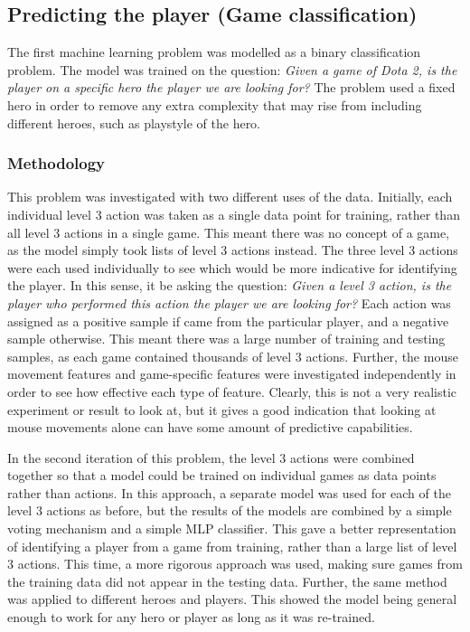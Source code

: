\documentclass{SizheArticle}
\begin{document}
\subsection{Predicting the player (Game classification)}
The first machine learning problem was modelled as a binary classification problem. The model was trained on the question: \textit{Given a game of Dota 2, is the player on a specific hero the player we are looking for?} The problem used a fixed hero in order to remove any extra complexity that may rise from including different heroes, such as playstyle of the hero. 


\subsubsection{Methodology}
This problem was investigated with two different uses of the data.  Initially, each individual level 3 action was taken as a single data point for training, rather than all level 3 actions in a single game. This meant there was no concept of a game, as the model simply took lists of level 3 actions instead. The three level 3 actions were each used individually to see which would be more indicative for identifying the player. In this sense, it be asking the question: \textit{Given a level 3 action, is the player who performed this action the player we are looking for?} Each action was assigned as a positive sample if came from the particular player, and a negative sample otherwise. This meant there was a large number of training and testing samples, as each game contained thousands of level 3 actions. Further, the mouse movement features and game-specific features were investigated independently in order to see how effective each type of feature. Clearly, this is not a very realistic experiment or result to look at, but it gives a good indication that looking at mouse movements alone can have some amount of predictive capabilities. 

In the second iteration of this problem, the level 3 actions were combined together so that a model could be trained on individual games as data points rather than actions. In this approach, a separate model was used for each of the level 3 actions as before, but the results of the models are combined by a simple voting mechanism and a simple MLP classifier. This gave a better representation of identifying a player from a game from training, rather than a large list of level 3 actions. This time, a more rigorous approach was used, making sure games from the training data did not appear in the testing data. Further, the same method was applied to different heroes and players. This showed the model being general enough to work for any hero or player as long as it was re-trained. 
\end{document}
